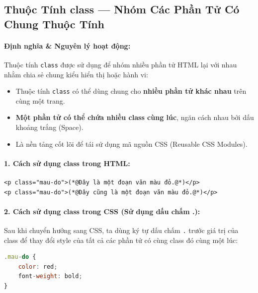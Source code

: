 \documentclass[11pt,oneside]{book}
\newcommand{\codeinline}[1]{\textcolor{accentOrange}{\texttt{#1}}}
\begin{document}
\subsection{Thuộc Tính class --- Nhóm Các Phần Tử Có Chung Thuộc Tính}

\paragraph{Định nghĩa \& Nguyên lý hoạt động:}
Thuộc tính \codeinline{class} được sử dụng để nhóm nhiều phần tử HTML lại với nhau nhằm chia sẻ chung kiểu hiển thị hoặc hành vi:
\begin{itemize}[leftmargin=1.8em, itemsep=3pt, parsep=0pt]
    \item Thuộc tính \codeinline{class} có thể dùng chung cho \textbf{nhiều phần tử khác nhau} trên cùng một trang.
    \item \textbf{Một phần tử có thể chứa nhiều class cùng lúc}, ngăn cách nhau bởi dấu khoảng trắng (Space).
    \item Là nền tảng cốt lõi để tái sử dụng mã nguồn CSS (Reusable CSS Modules).
\end{itemize}

\paragraph{1. Cách sử dụng class trong HTML:}
\begin{codeWindow}
\begin{lstlisting}[language=HTML5]
<p class="mau-do">(*@Đây là một đoạn văn màu đỏ.@*)</p>
<p class="mau-do">(*@Đây cũng là một đoạn văn màu đỏ.@*)</p>
\end{lstlisting}
\end{codeWindow}

\paragraph{2. Cách sử dụng class trong CSS (Sử dụng dấu chấm .):}
Sau khi chuyển hướng sang CSS, ta dùng ký tự dấu chấm \codeinline{.} trước giá trị của class để thay đổi style của tất cả các phần tử có cùng class đó cùng một lúc:
\begin{codeWindow}
\begin{lstlisting}[language=JavaScript]
.mau-do {
    color: red;
    font-weight: bold;
}
\end{lstlisting}
\end{codeWindow}
\end{document}
